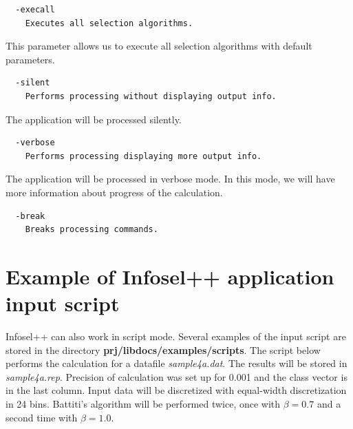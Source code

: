 \documentclass[a4paper,fleqn]{report}
\begin{document}
\begin{scriptsize}
 \begin{verbatim}
  -execall
    Executes all selection algorithms.
 \end{verbatim}
\end{scriptsize}

  This parameter allows us to execute all selection algorithms with default parameters.

\begin{scriptsize}
 \begin{verbatim}
  -silent
    Performs processing without displaying output info.
 \end{verbatim}
\end{scriptsize}
  The application will be processed silently.

\begin{scriptsize}
 \begin{verbatim}
  -verbose
    Performs processing displaying more output info.
  \end{verbatim}
\end{scriptsize}
  The application will be processed in verbose mode. In this mode, we will have more information about progress of the calculation.
   
\begin{scriptsize}
 \begin{verbatim}
  -break
    Breaks processing commands.
  \end{verbatim}
\end{scriptsize}

\section{Example of Infosel++ application input script}

 Infosel++ can also work in script mode. Several examples of the input script are stored in the directory 
{\bf prj/libdocs/examples/scripts}.
The script below performs the calculation for a datafile {\it sample4a.dat}. The results will be stored in {\it sample4a.rep}.
Precision of calculation was set up for 0.001 and the class vector is in the last column. Input data will be discretized with 
equal-width discretization in 24 bins. Battiti's \cite{Battiti1994} algorithm will be performed twice, once with $\beta=0.7$ and 
a second time with $\beta=1.0$.
\end{document}
